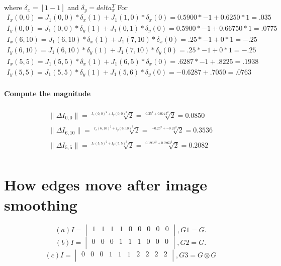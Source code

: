 \documentclass[11pt,english]{article}
\begin{document}
  where $\delta_x = [1 -1] $  and  $\delta_y = delta_x^{T} $
  For 
  \begin{align*}
  I_x(0,0) = J_1(0,0)*\delta_x(1) + J_1(1,0)*\delta_x(0) =  0.5900*-1 +  0.6250*1 = .035 \\
  I_y(0,0)= J_1(0,0)*\delta_y(1) + J_1(0,1)*\delta_y(0) =  0.5900*-1 +  0.66750*1 = .0775\\
  I_x(6,10) = J_1(6,10)*\delta_x(1) + J_1( 7,10)*\delta_x(0)= .25*-1 + 0*1 = -.25\\
  I_y(6,10) = J_1(6,10)*\delta_y(1) + J_1( 7,10)*\delta_y(0) = .25*-1 + 0*1 = -.25 \\
  I_x(5,5) = J_1(5,5)*\delta_x(1) + J_1( 6,5)*\delta_x(0)  = .6287*-1 + .8225 = .1938 \\
   I_y(5,5) = J_1(5,5)*\delta_y(1) + J_1(5,6)*\delta_y(0) = -0.6287 +.7050 = .0763
  \end{align*}
  
\paragraph{Compute the magnitude}

\begin{align*}
\|\Delta I_{0,0}\| = \sqrt[I_x(0,0)^2 + I_y(0,0)^2]{2} = \sqrt[ 0.35^2 +0.0775^2 ]{2}  = 0.0850\\
\|\Delta I_{6,10}\| = \sqrt[I_x(6,10)^2 + I_y(6,10)^2]{2} = \sqrt[ -0.25^2 +-0.25^2 ]{2}  = 0.3536\\
\|\Delta I_{5,5}\| = \sqrt[I_x(5,5)^2 + I_y(5,5)^2]{2} = \sqrt[ 0.1938^2 +0.0763^2 ]{2}  = 0.2082\\
\end{align*}

\section*{How edges move after image smoothing}

$$(a) I = \begin{vmatrix}
 1 &1& 1& 1& 0& 0 &0& 0& 0 \\
\end{vmatrix} , G1 = G.$$
$$(b) I = \begin{vmatrix}
 0 &0& 0& 1& 1& 1& 0 &0& 0 \\
\end{vmatrix}, G2 = G.$$
$$(c) I = \begin{vmatrix}
0& 0& 0& 1& 1 &1& 2& 2& 2& 2\\ 
\end{vmatrix}, G3 = G \otimes G$$
\end{document}
